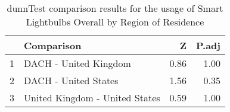 \begin{table}[ht]
\centering
\begin{tabular}{rlrr}
  \hline
 & Comparison & Z & P.adj \\ 
  \hline
1 & DACH - United Kingdom & 0.86 & 1.00 \\ 
  2 & DACH - United States & 1.56 & 0.35 \\ 
  3 & United Kingdom - United States & 0.59 & 1.00 \\ 
   \hline
\end{tabular}
\caption{dunnTest comparison results for the usage of Smart Lightbulbs Overall by Region of Residence} 
\end{table}
